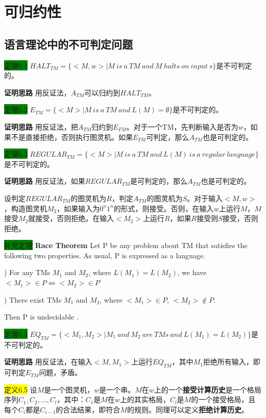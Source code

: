\documentclass[a4paper]{article}
\begin{document}
\section{可归约性}

\subsection{语言理论中的不可判定问题}

	\colorbox{green}{定理6.1} $HALT_{TM}=\{<M,w>|M~is~a~TM~and~M~halts~on~input~s\}$是不可判定的。
	
	\textbf{证明思路} \quad 用反证法，$A_{TM}$可以归约到$HALT_{TM}$。
	
	\colorbox{green}{定理6.2} $E_{TM}=\{<M>|M~is~a~TM~and~L(M)=\emptyset\}$是不可判定的。
	
	\textbf{证明思路} \quad 用反证法，把$A_{TM}$归约到$E_{TM}$。对于一个TM，先判断输入是否为$w$，如果不是直接拒绝，否则执行图灵机。如果$E_{TM}$可判定，那么$A_{TM}$也是可判定的。
	
	\colorbox{green}{定理6.3} $REGULAR_{TM}=\{<M>|M~is~a~TM~and~L(M)~is~a~regular~language\}$是不可判定的。
	
	\textbf{证明思路} \quad 用反证法，如果$REGULAR_{TM}$是可判定的，那么$A_{TM}$也是可判定的。
	
	设判定$REGULAR_{TM}$的图灵机为$R$，判定$A_{TM}$的图灵机为$S$。对于输入$<M,w>$，构造图灵机$M_2$，如果输入为$0^n1^n$的形式，则接受。否则，在输入$w$上运行$M$，$M$接受$M_2$就接受，否则拒绝。在输入$<M_2>$上运行$R$，如果$R$接受则$S$接受，否则拒绝。

	\colorbox{green}{补充定理} \textbf{Race Theorem} Let P be any problem about TM that satisfies the following two properties. As usual, P is expressed as a language.

	) For any TMs $M_1$ and $M_2$, where $L(M_1)=L(M_2)$, we have $<M_1>\in P \Leftrightarrow <M_2>\in P$
	
	) There exist TMs $M_1$ and $M_2$, where $<M_1>\in P$, $<M_2>\notin P$.
	
	Then \color{red} P is undecidable \color{black}.

	\colorbox{green}{定理6.4} $EQ_{TM}=\{<M_1,M_2>|M_1~and~M_2~are~TMs~and~L(M_1)=L(M_2)\}$是不可判定的。
	
	\textbf{证明思路} \quad 用反证法，在输入$<M,M_1>$上运行$EQ_{TM}$，其中$M_1$拒绝所有输入，即可判定$E_{TM}$问题，矛盾。
	
	\colorbox{yellow}{定义6.5} 设$M$是一个图灵机，$w$是一个串。$M$在$w$上的一个\textbf{接受计算历史}是一个格局序列$C_1,C_2,\dots,C_l$，其中：$C_1$是$M$在$w$上的其实格局，$C_l$是$M$的一个接受格局，且每个$C_i$都是$C_{i-1}$的合法结果，即符合$M$的规则。同理可以定义\textbf{拒绝计算历史}。
\end{document}
